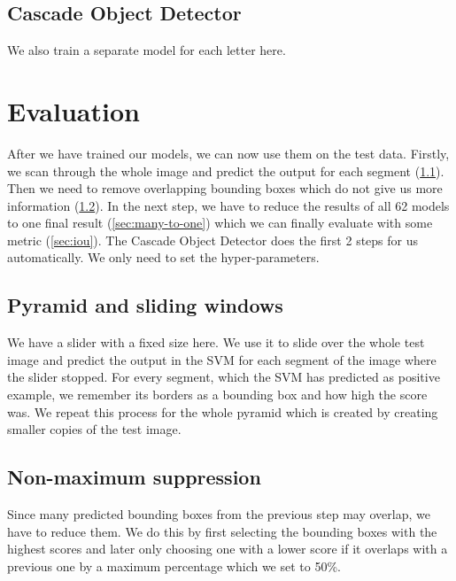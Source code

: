 \documentclass[conference]{IEEEtran}
\begin{document}

\subsection{Cascade Object Detector}


We also train a separate model for each letter here.

\section{Evaluation}

\noindent
After we have trained our models, we can now use them on the test data. Firstly, we scan through the whole image and predict the output for each segment (\ref{sec:slide}). Then we need to remove overlapping bounding boxes which do not give us more information (\ref{sec:non-max-sup}). In the next step, we have to reduce the results of all 62 models to one final result (\ref{sec:many-to-one}) which we can finally evaluate with some metric (\ref{sec:iou}). The Cascade Object Detector does the first 2 steps for us automatically. We only need to set the hyper-parameters.

\subsection{Pyramid and sliding windows}\label{sec:slide}

We have a slider with a fixed size here. We use it to slide over the whole test image and predict the output in the SVM for each segment of the image where the slider stopped. For every segment, which the SVM has predicted as positive example, we remember its borders as a bounding box and how high the score was. We repeat this process for the whole pyramid which is created by creating smaller copies of the test image.


\subsection{Non-maximum suppression}\label{sec:non-max-sup}

Since many predicted bounding boxes from the previous step may overlap, we have to reduce them. We do this by first selecting the bounding boxes with the highest scores and later only choosing one with a lower score if it overlaps with a previous one by a maximum percentage which we set to 50\%.  
\end{document}

